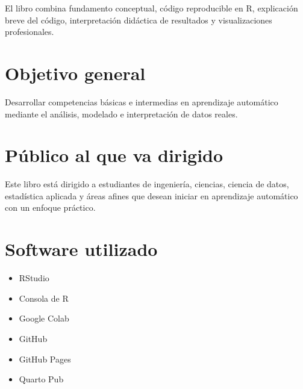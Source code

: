 \documentclass[
  spanish,
  11pt,
  letterpaper,
]{book}
\providecommand{\tightlist}{%
  \setlength{\itemsep}{0pt}\setlength{\parskip}{0pt}}
\begin{document}
\begin{tcolorbox}[enhanced jigsaw, arc=.35mm, bottomrule=.15mm, bottomtitle=1mm, breakable, colback=white, colbacktitle=quarto-callout-note-color!10!white, colframe=quarto-callout-note-color-frame, coltitle=black, left=2mm, leftrule=.75mm, opacityback=0, opacitybacktitle=0.6, rightrule=.15mm, title=\textcolor{quarto-callout-note-color}{\faInfo}\hspace{0.5em}{Enfoque del libro}, titlerule=0mm, toprule=.15mm, toptitle=1mm]

El libro combina fundamento conceptual, código reproducible en R,
explicación breve del código, interpretación didáctica de resultados y
visualizaciones profesionales.

\end{tcolorbox}

\section*{Objetivo general}\label{objetivo-general}


Desarrollar competencias básicas e intermedias en aprendizaje automático
mediante el análisis, modelado e interpretación de datos reales.

\section*{Público al que va
dirigido}\label{puxfablico-al-que-va-dirigido}


Este libro está dirigido a estudiantes de ingeniería, ciencias, ciencia
de datos, estadística aplicada y áreas afines que desean iniciar en
aprendizaje automático con un enfoque práctico.

\section*{Software utilizado}\label{software-utilizado}


\begin{itemize}
\tightlist
\item
  RStudio
\item
  Consola de R
\item
  Google Colab
\item
  GitHub
\item
  GitHub Pages
\item
  Quarto Pub
\end{itemize}
\end{document}
